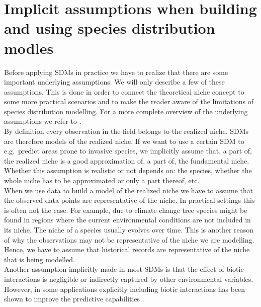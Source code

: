 \section{Implicit assumptions when building and using species distribution modles}
\label{sec:chTheEcologicalNicheConcept:NicheEquilibrium}
Before applying SDMs in practice we have to realize that there are some important underlying assumptions. We will only describe a few of these assumptions. This is done in order to connect the theoretical niche concept to some more practical scenarios and to make the reader aware of the limitations of species distribution modelling. For a more complete overview of the underlying assumptions we refer to \cite{wiens_niches_2009}.\\

By definition every observation in the field belongs to the realized niche. SDMs are therefore models of the realized niche. If we want to use a certain SDM to e.g.\ predict areas prone to invasive species, we implicitly assume that, a part of, the realized niche is a good approximation of, a part of, the fundamental niche. Whether this assumption is realistic or not depends on: the species, whether the whole niche has to be approximated or only a part thereof, etc.\\

When we use data to build a model of the realized niche we have to assume that the observed data-points are representative of the niche. In practical settings this is often not the case. For example, due to climate change tree species might be found in regions where the current environmental conditions are not included in its niche. The niche of a species usually evolves over time. This is another reason of why the observations may not be representative of the niche we are modelling. Hence, we have to assume that historical records are representative of the niche that is being modelled. \\

Another assumption implicitly made in most SDMs is that the effect of biotic interactions is negligible or indirectly captured by other environmental variables. However, in some applications explicitly including biotic interactions has been shown to improve the predictive capabilities \parencite{heikkinen_biotic_2007}. \\






